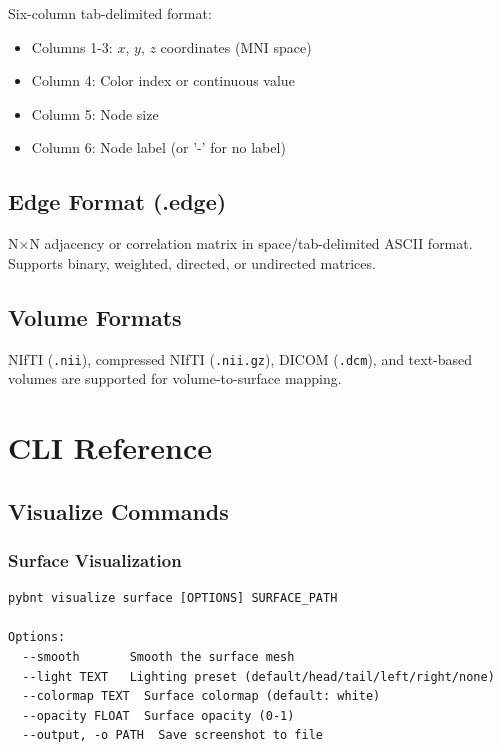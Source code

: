 \documentclass[11pt,a4paper]{article}
\begin{document}
Six-column tab-delimited format:
\begin{itemize}
    \item Columns 1-3: $x$, $y$, $z$ coordinates (MNI space)
    \item Column 4: Color index or continuous value
    \item Column 5: Node size
    \item Column 6: Node label (or '-' for no label)
\end{itemize}

\subsection{Edge Format (.edge)}

N×N adjacency or correlation matrix in space/tab-delimited ASCII format. Supports binary, weighted, directed, or undirected matrices.

\subsection{Volume Formats}

NIfTI (\texttt{.nii}), compressed NIfTI (\texttt{.nii.gz}), DICOM (\texttt{.dcm}), and text-based volumes are supported for volume-to-surface mapping.

\section{CLI Reference}

\subsection{Visualize Commands}

\subsubsection{Surface Visualization}

\begin{lstlisting}[caption=pybnt visualize surface]
pybnt visualize surface [OPTIONS] SURFACE_PATH

Options:
  --smooth       Smooth the surface mesh
  --light TEXT   Lighting preset (default/head/tail/left/right/none)
  --colormap TEXT  Surface colormap (default: white)
  --opacity FLOAT  Surface opacity (0-1)
  --output, -o PATH  Save screenshot to file
\end{lstlisting}
\end{document}
